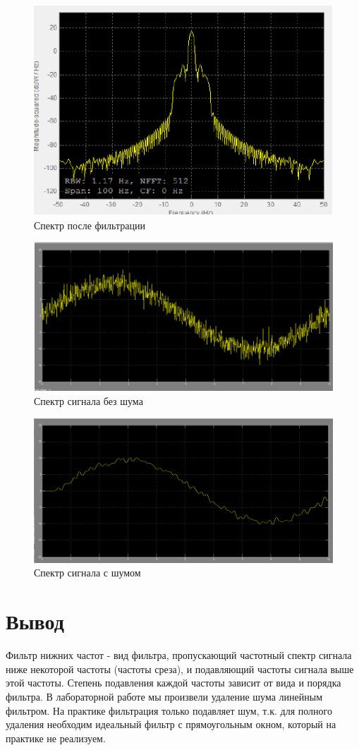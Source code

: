 \begin{figure}[H]
   \includegraphics[scale=0.7]{lab6/7.png}
   \caption{Спектр после фильтрации}
\end{figure}
\begin{figure}[H]
   \includegraphics[scale=0.7]{lab6/8.png}
   \caption{Спектр сигнала без шума}
\end{figure}

\begin{figure}[H]
   \includegraphics[scale=0.7]{lab6/9.png}
   \caption{Спектр сигнала с шумом}
\end{figure}

\section{Вывод}

Фильтр нижних частот - вид фильтра, пропускающий частотный спектр сигнала ниже некоторой частоты (частоты среза), и подавляющий частоты сигнала выше этой частоты. Степень подавления каждой частоты зависит от
вида и порядка фильтра.
В лабораторной работе мы произвели удаление шума линейным фильтром. На практике фильтрация только подавляет шум, т.к. для полного удаления необходим идеальный фильтр
с прямоугольным окном, который на практике не реализуем.